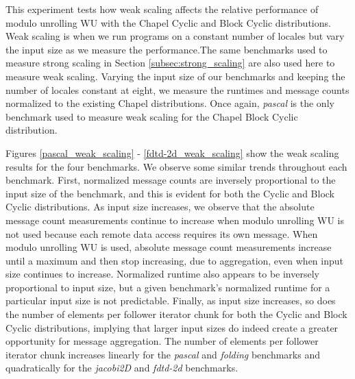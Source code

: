 This experiment tests how weak scaling affects the relative performance of modulo unrolling WU with the Chapel Cyclic and Block Cyclic distributions. Weak scaling is when we run programs on a constant number of locales but vary the input size as we measure the performance.The same benchmarks used to measure strong scaling in Section \ref{subsec:strong_scaling} are also used here to measure weak scaling. Varying the input size of our benchmarks and keeping the number of locales constant at eight, we measure the runtimes and message counts normalized to the existing Chapel distributions. Once again, \textit{pascal} is the only benchmark used to measure weak scaling for the Chapel Block Cyclic distribution. 

Figures \ref{pascal_weak_scaling} - \ref{fdtd-2d_weak_scaling} show the weak scaling results for the four benchmarks. We observe some similar trends throughout each benchmark. First, normalized message counts are inversely proportional to the input size of the benchmark, and this is evident for both the Cyclic and Block Cyclic distributions. As input size increases, we observe that the absolute message count measurements continue to increase when modulo unrolling WU is not used because each remote data access requires its own message. When modulo unrolling WU is used, absolute message count measurements increase until a maximum and then stop increasing, due to aggregation, even when input size continues to increase. Normalized runtime also appears to be inversely proportional to input size, but a given benchmark's normalized runtime for a particular input size is not predictable. Finally, as input size increases, so does the number of elements per follower iterator chunk for both the Cyclic and Block Cyclic distributions, implying that larger input sizes do indeed create a greater opportunity for message aggregation. The number of elements per follower iterator chunk increases linearly for the \textit{pascal} and \textit{folding} benchmarks and quadratically for the \textit{jacobi2D} and \textit{fdtd-2d} benchmarks.

